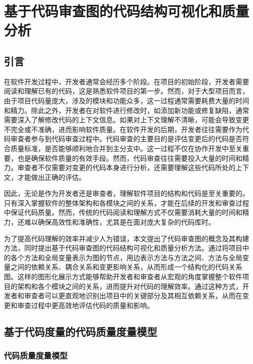 \chapter{基于代码审查图的代码结构可视化和质量分析}
\section{引言}


在软件开发过程中，开发者通常会经历多个阶段。在项目的初始阶段，开发者需要阅读和理解已有的代码，这是熟悉软件项目的第一步。然而，对于大型项目而言，由于项目代码量庞大，涉及的模块和功能众多，这一过程通常需要耗费大量的时间和精力。除此之外，开发者在对软件进行修改时，如添加新功能或修复缺陷，通常需要深入了解修改代码的上下文信息。如果对上下文理解不清晰，可能会导致变更不完全或不准确，进而影响软件质量。在软件开发的后期，开发者往往需要作为代码审查者参与到代码审查过程中。代码审查的主要目的是评估变更后的代码是否符合质量标准，是否能够顺利地合并到主分支中。这一过程不仅在协作开发中至关重要，也是确保软件质量的有效手段。然而，代码审查往往需要投入大量的时间和精力\cite{花子涵2024代码审查自动化研究综述}。审查者不仅需要对变更的代码本身进行分析，还需要理解这些代码所处的上下文，才能做出正确的评估。

因此，无论是作为开发者还是审查者，理解软件项目的结构和代码是至关重要的。只有深入掌握软件的整体架构和各模块之间的关系，才能在后续的开发和审查过程中保证代码质量。然而，传统的代码阅读和理解方式不仅需要消耗大量的时间和精力，还难以确保高效性和准确性，尤其是在面对庞大复杂的代码库时。

为了提高代码理解的效率并减少人为错误，本文提出了代码审查图的概念及其构建方法，同时提出基于代码审查图的代码结构可视化和质量分析方法。通过将项目中的各个方法和全局变量表示为图的节点，用边表示方法与方法之间、方法与全局变量之间的依赖关系、耦合关系和变更影响关系，从而形成一个结构化的代码关系图。这样的图形化展示方式能够帮助开发者和审查者从宏观的角度掌握整个软件项目的架构和各个模块之间的关系，进而提升对代码的理解效率。通过这种方式，开发者和审查者可以更直观地识别出项目中的关键部分及其相互依赖关系，从而在变更和审查过程中更高效地评估代码的质量和影响。

\section{基于代码度量的代码质量度量模型}

\subsection{代码质量度量模型}
\label{3_代码质量度量模型}


